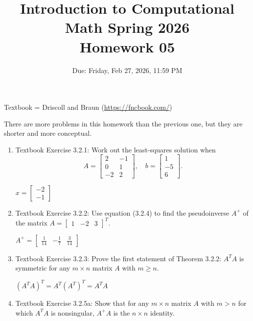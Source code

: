 \documentclass[reqno, answers]{exam}
\title{Introduction to Computational Math Spring 2026 \\ Homework 05}
\date{Due: Friday, Feb 27, 2026, 11:59 PM}
\author{}
\begin{document}
\maketitle
\thispagestyle{empty}

Textbook = Driscoll and Braun (\url{https://fncbook.com/})

There are more problems in this homework than the previous one, but they are shorter and more conceptual.


\begin{enumerate}

\item Textbook Exercise 3.2.1: Work out the least-squares solution when
\[
A = \begin{bmatrix} 2 & -1 \\ 0 & 1 \\ -2 & 2 \end{bmatrix}, \quad b = \begin{bmatrix} 1 \\ -5 \\ 6 \end{bmatrix}.
\]

\begin{solution}
$x = \begin{bmatrix} -2 \\ -1 \end{bmatrix}$
\end{solution}

\item Textbook Exercise 3.2.2: Use equation (3.2.4) to find the pseudoinverse $A^+$ of the matrix $A = \begin{bmatrix} 1 & -2 & 3 \end{bmatrix}^T$.

\begin{solution}
$A^+ = \begin{bmatrix} \frac{1}{14} & -\frac{1}{7} & \frac{3}{14} \end{bmatrix}$
\end{solution}

\item Textbook Exercise 3.2.3: Prove the first statement of Theorem 3.2.2: $A^T A$ is symmetric for any $m \times n$ matrix $A$ with $m \geq n$.

\begin{solution}
$(A^T A)^T = A^T (A^T)^T = A^T A$
\end{solution}

\item Textbook Exercise 3.2.5a: Show that for any $m \times n$ matrix $A$ with $m > n$ for which $A^T A$ is nonsingular, $A^+ A$ is the $n \times n$ identity.


\end{enumerate}
\end{document}
